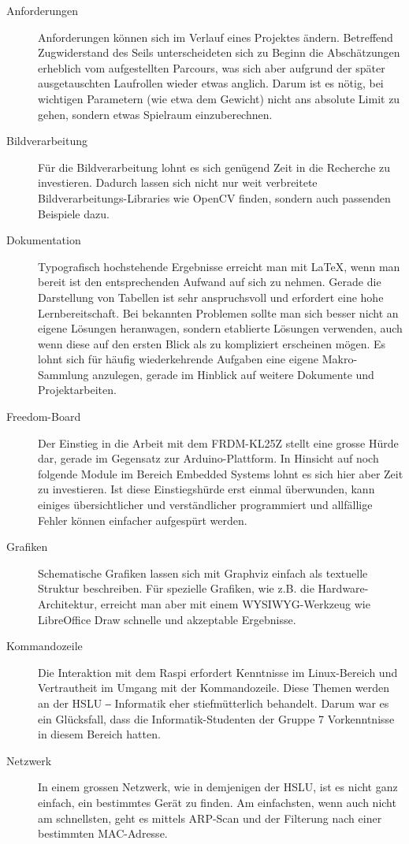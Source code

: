 \begin{description}
\item[Anforderungen] Anforderungen können sich im Verlauf eines Projektes ändern. Betreffend Zugwiderstand des Seils unterscheideten sich zu Beginn die Abschätzungen erheblich vom aufgestellten Parcours, was sich aber aufgrund der später ausgetauschten Laufrollen wieder etwas anglich. Darum ist es nötig, bei wichtigen Parametern (wie etwa dem Gewicht) nicht ans absolute Limit zu gehen, sondern etwas Spielraum einzuberechnen.
\item[Bildverarbeitung] Für die Bildverarbeitung lohnt es sich genügend Zeit in die Recherche zu investieren. Dadurch lassen sich nicht nur weit verbreitete Bildverarbeitungs-Libraries wie OpenCV finden, sondern auch passenden Beispiele dazu.
\item[Dokumentation] Typografisch hochstehende Ergebnisse erreicht man mit \LaTeX, wenn man bereit ist den entsprechenden Aufwand auf sich zu nehmen. Gerade die Darstellung von Tabellen ist sehr anspruchsvoll und erfordert eine hohe Lernbereitschaft. Bei bekannten Problemen sollte man sich besser nicht an eigene Lösungen heranwagen, sondern etablierte Lösungen verwenden, auch wenn diese auf den ersten Blick als zu kompliziert erscheinen mögen. Es lohnt sich für häufig wiederkehrende Aufgaben eine eigene Makro-Sammlung anzulegen, gerade im Hinblick auf weitere Dokumente und Projektarbeiten.
\item[Freedom-Board] Der Einstieg in die Arbeit mit dem FRDM-KL25Z stellt eine grosse Hürde dar, gerade im Gegensatz zur Arduino-Plattform. In Hinsicht auf noch folgende Module im Bereich Embedded Systems lohnt es sich hier aber Zeit zu investieren. Ist diese Einstiegshürde erst einmal überwunden, kann einiges übersichtlicher und verständlicher programmiert und allfällige Fehler können einfacher aufgespürt werden.
\item[Grafiken] Schematische Grafiken lassen sich mit Graphviz einfach als textuelle Struktur beschreiben. Für spezielle Grafiken, wie z.B. die Hardware-Architektur, erreicht man aber mit einem WYSIWYG-Werkzeug wie LibreOffice Draw schnelle und akzeptable Ergebnisse.
\item[Kommandozeile] Die Interaktion mit dem Raspi erfordert Kenntnisse im Linux-Bereich und Vertrautheit im Umgang mit der Kommandozeile. Diese Themen werden an der HSLU ‒ Informatik eher stiefmütterlich behandelt. Darum war es ein Glücksfall, dass die Informatik-Studenten der Gruppe 7 Vorkenntnisse in diesem Bereich hatten.
\item[Netzwerk] In einem grossen Netzwerk, wie in demjenigen der HSLU, ist es nicht ganz einfach, ein bestimmtes Gerät zu finden. Am einfachsten, wenn auch nicht am schnellsten, geht es mittels ARP-Scan und der Filterung nach einer bestimmten MAC-Adresse.

\end{description}
